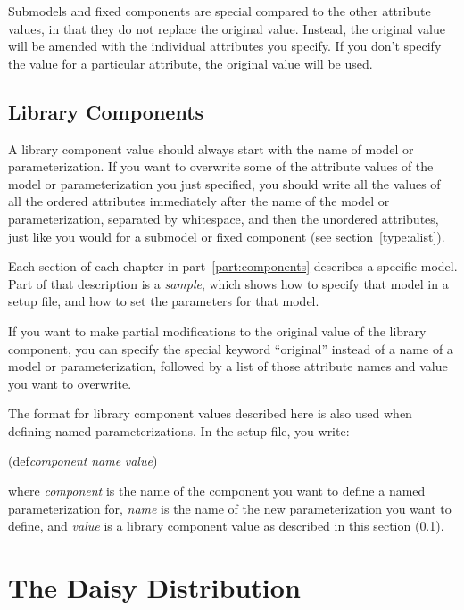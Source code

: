Submodels and fixed components are special compared to the other
attribute values, in that they do not replace the original value.
Instead, the original value will be amended with the individual
attributes you specify.  If you don't specify the value for a
particular attribute, the original value will be used.  

\subsection{Library Components}
\label{type:object}

A library component value should always start with the name of model
or parameterization.  If you want to overwrite some of the attribute
values of the model or parameterization you just specified, you should
write all the values of all the ordered attributes immediately after
the name of the model or parameterization, separated by whitespace,
and then the unordered attributes, just like you would for a submodel
or fixed component (see section~\ref{type:alist}).

Each section of each chapter in part~\ref{part:components} describes a
specific model.  Part of that description is a \emph{sample}, which
shows how to specify that model in a setup file, and how to set the
parameters for that model.

If you want to make partial modifications to the original value of the
library component, you can specify the special keyword ``original''
instead of a name of a model or parameterization, followed by a list
of those attribute names and value you want to overwrite.

The format for library component values described here is also used
when defining named parameterizations.  In the setup file, you
write: 

\begin{tt}
  (def\emph{component} \emph{name} \emph{value})
\end{tt}

where \emph{component} is the name of the component you want to define
a named parameterization for, \emph{name} is the name of the new
parameterization you want to define, and \emph{value} is a library
component value as described in this section (\ref{type:object}).

\section{The Daisy Distribution}
\label{sec:distribution}

